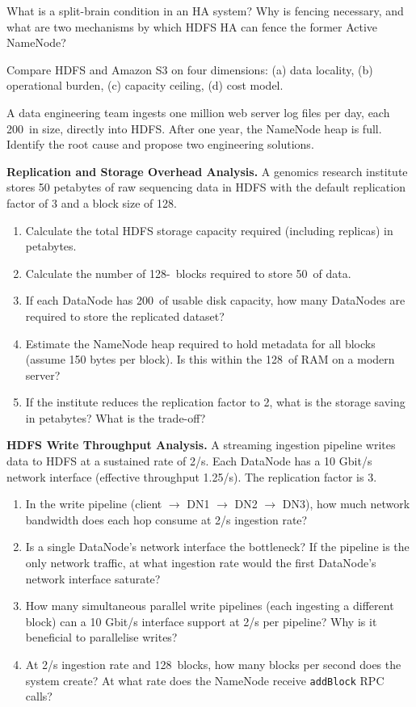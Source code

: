 \sq What is a split-brain condition in an HA system? Why is fencing
necessary, and what are two mechanisms by which HDFS HA can fence the
former Active NameNode?

\sq Compare HDFS and Amazon S3 on four dimensions: (a) data locality,
(b) operational burden, (c) capacity ceiling, (d) cost model.

\sq A data engineering team ingests one million web server log files per
day, each 200\KB\ in size, directly into HDFS. After one year, the
NameNode heap is full. Identify the root cause and propose two
engineering solutions.

\bigskip
{}

\ap \textbf{Replication and Storage Overhead Analysis.}
A genomics research institute stores 50 petabytes of raw sequencing
data in HDFS with the default replication factor of 3 and a block
size of 128\MB.

\begin{enumerate}[label=(\alph*)]
  \item Calculate the total HDFS storage capacity required (including
        replicas) in petabytes.
  \item Calculate the number of 128-\MB\ blocks required to store
        50\PB\ of data.
  \item If each DataNode has 200\TB\ of usable disk capacity, how many
        DataNodes are required to store the replicated dataset?
  \item Estimate the NameNode heap required to hold metadata for all
        blocks (assume 150 bytes per block). Is this within the 128\GB\
        of RAM on a modern server?
  \item If the institute reduces the replication factor to 2, what is
        the storage saving in petabytes? What is the trade-off?
\end{enumerate}

\ap \textbf{HDFS Write Throughput Analysis.}
A streaming ingestion pipeline writes data to HDFS at a sustained rate
of 2\GB/s. Each DataNode has a 10 Gbit/s network interface (effective
throughput 1.25\GB/s). The replication factor is 3.

\begin{enumerate}[label=(\alph*)]
  \item In the write pipeline (client $\to$ DN1 $\to$ DN2 $\to$ DN3),
        how much network bandwidth does each hop consume at 2\GB/s
        ingestion rate?
  \item Is a single DataNode's network interface the bottleneck? If the
        pipeline is the only network traffic, at what ingestion rate
        would the first DataNode's network interface saturate?
  \item How many simultaneous parallel write pipelines (each ingesting
        a different block) can a 10 Gbit/s interface support at 2\GB/s
        per pipeline? Why is it beneficial to parallelise writes?
  \item At 2\GB/s ingestion rate and 128\MB\ blocks, how many blocks
        per second does the system create? At what rate does the
        NameNode receive \texttt{addBlock} RPC calls?
\end{enumerate}

